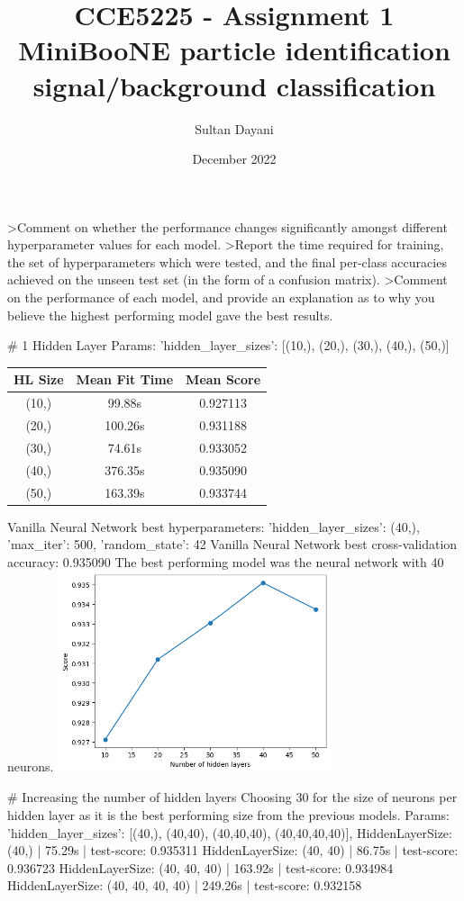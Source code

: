 \documentclass[12pt, letterpaper]{article}
\title{CCE5225 - Assignment 1 \\
\large MiniBooNE particle identification \\ signal/background classification}
\author{Sultan Dayani}
\date{December 2022}
\begin{document}
\maketitle
\pagebreak

\textgreater{Comment on whether the performance changes significantly amongst different hyperparameter values for each model.}
\textgreater{Report the time required for training, the set of hyperparameters which were tested, and the final per-class accuracies achieved on the unseen test set (in the form of a confusion matrix).}
\textgreater{Comment on the performance of each model, and provide an explanation as to why you believe the highest performing model gave the best results.}

# 1 Hidden Layer
Params: 'hidden_layer_sizes': [(10,), (20,), (30,), (40,), (50,)]
\begin{tabular}{|c c c|}
\hline
HL Size & Mean Fit Time & Mean Score \\ [0.5ex] 
\hline
(10,) & 99.88s & 0.927113 \\
\hline
(20,) & 100.26s & 0.931188 \\
\hline
(30,) & 74.61s & 0.933052 \\
\hline
(40,) & 376.35s & 0.935090 \\
\hline
(50,) & 163.39s & 0.933744 \\ 
\hline
\end{tabular}
Vanilla Neural Network best hyperparameters: {'hidden_layer_sizes': (40,), 'max_iter': 500, 'random_state': 42}
Vanilla Neural Network best cross-validation accuracy: 0.935090
The best performing model was the neural network with 40 neurons.
\includegraphics[width=0.6\textwidth]{1hiddenlayer_scores.png}

# Increasing the number of hidden layers
Choosing 30 for the size of neurons per hidden layer as it is the best performing size from the previous models.
Params: 'hidden_layer_sizes': [(40,), (40,40), (40,40,40), (40,40,40,40)],
HiddenLayerSize: (40,) | 75.29s | test-score: 0.935311
HiddenLayerSize: (40, 40) | 86.75s | test-score: 0.936723
HiddenLayerSize: (40, 40, 40) | 163.92s | test-score: 0.934984
HiddenLayerSize: (40, 40, 40, 40) | 249.26s | test-score: 0.932158
\end{document}
